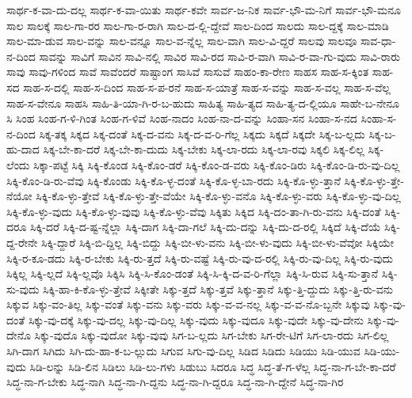 {ಸಾರ್ಥ-ಕ-ವಾ-ದು-ದಲ್ಲ
ಸಾರ್ಥ-ಕ-ವಾ-ಯಿತು
ಸಾರ್ಥ-ಕವೇ
ಸಾರ್ವ-ಜ-ನಿಕ
ಸಾರ್ವ-ಭೌ-ಮ-ನಿಗೆ
ಸಾರ್ವ-ಭೌ-ಮನೂ
ಸಾಲ
ಸಾಲಕ್ಕೆ
ಸಾಲ-ಗಾ-ರರ
ಸಾಲ-ಗಾ-ರ-ರಾಗಿ
ಸಾಲ-ದ-ಲ್ಲಿ-ದ್ದೇವೆ
ಸಾಲ-ದಿಂದ
ಸಾಲದು
ಸಾಲ-ದ್ದಕ್ಕೆ
ಸಾಲ-ಮಾಡಿ
ಸಾಲ-ಮಾ-ಡುವ
ಸಾಲ-ವನ್ನು
ಸಾಲ-ವನ್ನೂ
ಸಾಲ-ವ-ನ್ನೆಲ್ಲ
ಸಾಲ-ವಾಗಿ
ಸಾಲ-ವಿ-ದ್ದರೆ
ಸಾಲವು
ಸಾಲವೂ
ಸಾವ-ಧಾ-ನ-ದಿಂದ
ಸಾವನ್ನು
ಸಾವಿಗೆ
ಸಾವಿನ
ಸಾವಿ-ನಲ್ಲಿ
ಸಾವಿರ
ಸಾವಿ-ರದ
ಸಾವಿ-ರ-ವಾಗಿ
ಸಾವಿ-ರ-ವಾ-ಗು-ವುದು
ಸಾವಿ-ರಾರು
ಸಾವು
ಸಾವು-ಗಳಿಂದ
ಸಾವೆ
ಸಾವೆಂದರೆ
ಸಾಷ್ಟಾಂಗ
ಸಾಸಿವೆ
ಸಾಸುವೆ
ಸಾಹಂ-ಕಾ-ರೇಣ
ಸಾಹಸ
ಸಾಹ-ಸ-ಕ್ಕಿಂತ
ಸಾಹ-ಸದ
ಸಾಹ-ಸ-ದಲ್ಲಿ
ಸಾಹ-ಸ-ದಿಂದ
ಸಾಹ-ಸ-ಪ-ರನೆ
ಸಾಹ-ಸ-ಯಾತ್ರೆ
ಸಾಹ-ಸ-ವನ್ನು
ಸಾಹ-ಸ-ವಲ್ಲ
ಸಾಹ-ಸ-ವೆಲ್ಲ
ಸಾಹ-ಸ-ವೇನೂ
ಸಾಹಸಿ
ಸಾಹಿ-ತಿ-ಯಾ-ಗಿ-ರ-ಬ-ಹುದು
ಸಾಹಿತ್ಯ
ಸಾಹಿ-ತ್ಯದ
ಸಾಹಿ-ತ್ಯ-ದ-ಲ್ಲಿಯೂ
ಸಾಹೇ-ಬ-ನೇನೂ
ಸಿ
ಸಿಂಹ
ಸಿಂಹ-ಗ-ಳಿ-ಗಿಂತ
ಸಿಂಹ-ಗ-ಳಿವೆ
ಸಿಂಹ-ನಾದಂ
ಸಿಂಹ-ನಾ-ದ-ವನ್ನು
ಸಿಂಹಾ-ಸನ
ಸಿಂಹಾ-ಸ-ನದ
ಸಿಂಹಾ-ಸ-ನ-ದಿಂದ
ಸಿಕ್ಕ-ತಕ್ಕ
ಸಿಕ್ಕದ
ಸಿಕ್ಕ-ದಂತೆ
ಸಿಕ್ಕ-ದ-ವನು
ಸಿಕ್ಕ-ದ-ವ-ರಿ-ಗೆಲ್ಲ
ಸಿಕ್ಕದು
ಸಿಕ್ಕದೆ
ಸಿಕ್ಕದೇ
ಸಿಕ್ಕ-ಬ-ಲ್ಲದು
ಸಿಕ್ಕ-ಬ-ಹು-ದಾದ
ಸಿಕ್ಕ-ಬೇ-ಕಾ-ದರೆ
ಸಿಕ್ಕ-ಬೇ-ಕಾ-ದುದು
ಸಿಕ್ಕ-ಬೇಕು
ಸಿಕ್ಕ-ಲಾ-ರದು
ಸಿಕ್ಕ-ಲಾ-ರವು
ಸಿಕ್ಕಲಿ
ಸಿಕ್ಕ-ಲಿಲ್ಲ
ಸಿಕ್ಕ-ಲೆಂದು
ಸಿಕ್ಕಾ-ಪಟ್ಟೆ
ಸಿಕ್ಕಿ
ಸಿಕ್ಕಿ-ಕೊಂಡ
ಸಿಕ್ಕಿ-ಕೊಂ-ಡರೆ
ಸಿಕ್ಕಿ-ಕೊಂ-ಡ-ವರು
ಸಿಕ್ಕಿ-ಕೊಂ-ಡಿರು
ಸಿಕ್ಕಿ-ಕೊಂ-ಡಿ-ರು-ವು-ದಿಲ್ಲ
ಸಿಕ್ಕಿ-ಕೊಂ-ಡಿ-ರು-ವೆವು
ಸಿಕ್ಕಿ-ಕೊಂಡು
ಸಿಕ್ಕಿ-ಕೊ-ಳ್ಳ-ದಂತೆ
ಸಿಕ್ಕಿ-ಕೊ-ಳ್ಳ-ಬಾ-ರದು
ಸಿಕ್ಕಿ-ಕೊ-ಳ್ಳು-ತ್ತಾನೆ
ಸಿಕ್ಕಿ-ಕೊ-ಳ್ಳು-ತ್ತೇ-ನೆಯೋ
ಸಿಕ್ಕಿ-ಕೊ-ಳ್ಳು-ತ್ತೇವೆ
ಸಿಕ್ಕಿ-ಕೊ-ಳ್ಳು-ತ್ತೇ-ವೆಯೇ
ಸಿಕ್ಕಿ-ಕೊ-ಳ್ಳು-ವನೊ
ಸಿಕ್ಕಿ-ಕೊ-ಳ್ಳು-ವರು
ಸಿಕ್ಕಿ-ಕೊ-ಳ್ಳು-ವು-ದಿಲ್ಲ
ಸಿಕ್ಕಿ-ಕೊ-ಳ್ಳು-ವುದು
ಸಿಕ್ಕಿ-ಕೊ-ಳ್ಳು-ವುವು
ಸಿಕ್ಕಿ-ಕೊ-ಳ್ಳು-ವೆವು
ಸಿಕ್ಕಿತು
ಸಿಕ್ಕಿದ
ಸಿಕ್ಕಿ-ದಂ-ತಾ-ಗಿ-ರು-ವನು
ಸಿಕ್ಕಿ-ದಂತೆ
ಸಿಕ್ಕಿ-ದರೂ
ಸಿಕ್ಕಿ-ದರೆ
ಸಿಕ್ಕಿ-ದ-ಷ್ಟ-ನ್ನೆಲ್ಲಾ
ಸಿಕ್ಕಿ-ದಾಗ
ಸಿಕ್ಕಿ-ದಾ-ಗಲೆ
ಸಿಕ್ಕಿ-ದು-ದನ್ನು
ಸಿಕ್ಕಿ-ದು-ದ-ರಲ್ಲಿ
ಸಿಕ್ಕಿದೆ
ಸಿಕ್ಕಿ-ದೆಯೆ
ಸಿಕ್ಕಿ-ದ್ದ-ರೇನೇ
ಸಿಕ್ಕಿ-ದ್ದಾರೆ
ಸಿಕ್ಕಿ-ಬಿ-ದ್ದಿಲ್ಲ
ಸಿಕ್ಕಿ-ಬಿದ್ದು
ಸಿಕ್ಕಿ-ಬೀ-ಳು-ವನು
ಸಿಕ್ಕಿ-ಬೀ-ಳು-ವುದು
ಸಿಕ್ಕಿ-ಬೀ-ಳು-ವೆವೋ
ಸಿಕ್ಕಿಯೇ
ಸಿಕ್ಕಿ-ರ-ಕೂ-ಡದು
ಸಿಕ್ಕಿ-ರ-ಬೇಕು
ಸಿಕ್ಕಿ-ರು-ತ್ತದೆ
ಸಿಕ್ಕಿ-ರು-ವಷ್ಟೆ
ಸಿಕ್ಕಿ-ರು-ವು-ದ-ರಲ್ಲಿ
ಸಿಕ್ಕಿ-ರು-ವು-ದಿಲ್ಲ
ಸಿಕ್ಕಿ-ರು-ವುದು
ಸಿಕ್ಕಿಲ್ಲ
ಸಿಕ್ಕಿ-ಲ್ಲದೆ
ಸಿಕ್ಕಿ-ಲ್ಲವೊ
ಸಿಕ್ಕಿಸಿ
ಸಿಕ್ಕಿ-ಸಿ-ಕೊಂ-ಡಂತೆ
ಸಿಕ್ಕಿ-ಸಿ-ಕ್ಕಿ-ದ-ವ-ರಿ-ಗೆಲ್ಲಾ
ಸಿಕ್ಕಿ-ಸಿ-ರುವ
ಸಿಕ್ಕಿ-ಸು-ತ್ತಾನೆ
ಸಿಕ್ಕಿ-ಸು-ವುದು
ಸಿಕ್ಕಿ-ಹಾ-ಕಿ-ಕೊ-ಳ್ಳು-ತ್ತೇವೆ
ಸಿಕ್ಕೀತೇ
ಸಿಕ್ಕು-ತ್ತದೆ
ಸಿಕ್ಕು-ತ್ತವೆ
ಸಿಕ್ಕು-ತ್ತಾನೆ
ಸಿಕ್ಕು-ತ್ತಿ-ದ್ದುದು
ಸಿಕ್ಕು-ತ್ತಿ-ರು-ವನು
ಸಿಕ್ಕುವ
ಸಿಕ್ಕು-ವಂ-ತಿಲ್ಲ
ಸಿಕ್ಕು-ವಂತೆ
ಸಿಕ್ಕು-ವನು
ಸಿಕ್ಕು-ವರು
ಸಿಕ್ಕು-ವ-ವ-ನಲ್ಲ
ಸಿಕ್ಕು-ವ-ವ-ನೊ-ಬ್ಬನೇ
ಸಿಕ್ಕುವು
ಸಿಕ್ಕು-ವು-ದಂತೆ
ಸಿಕ್ಕು-ವು-ದಕ್ಕೆ
ಸಿಕ್ಕು-ವು-ದಲ್ಲ
ಸಿಕ್ಕು-ವು-ದಿಲ್ಲ
ಸಿಕ್ಕು-ವುದು
ಸಿಕ್ಕು-ವುದೂ
ಸಿಕ್ಕು-ವುದೇ
ಸಿಕ್ಕು-ವು-ದೇನು
ಸಿಕ್ಕು-ವು-ದೇನೊ
ಸಿಕ್ಕು-ವುದೊ
ಸಿಕ್ಕು-ವುದೋ
ಸಿಕ್ಕು-ವುವು
ಸಿಗ-ಬ-ಲ್ಲದು
ಸಿಗ-ಬೇಕು
ಸಿಗ-ರೇ-ಟಿಗೆ
ಸಿಗ-ಲಾ-ರದು
ಸಿಗ-ಲಿಲ್ಲ
ಸಿಗಿ-ದಾಗ
ಸಿಗಿದು
ಸಿಗಿ-ದು-ಹಾ-ಕ-ಬ-ಲ್ಲುದು
ಸಿಗುವ
ಸಿಗು-ವು-ದಿಲ್ಲ
ಸಿಡಿದ
ಸಿಡಿದು
ಸಿಡಿಯು
ಸಿಡಿ-ಯುವ
ಸಿಡಿ-ಯು-ವುದು
ಸಿಡಿ-ಲನ್ನು
ಸಿಡಿ-ಲಿನ
ಸಿಡಿಲು
ಸಿಡಿ-ಲು-ಗಳು
ಸಿಡುಬು
ಸಿದರೂ
ಸಿದ್ಧ
ಸಿದ್ಧ-ತೆ-ಗ-ಳೆಲ್ಲ
ಸಿದ್ಧ-ನಾ-ಗ-ಬೇ-ಕಾ-ದರೆ
ಸಿದ್ಧ-ನಾ-ಗ-ಬೇಕು
ಸಿದ್ಧ-ನಾಗಿ
ಸಿದ್ಧ-ನಾ-ಗಿ-ದ್ದನು
ಸಿದ್ಧ-ನಾ-ಗಿ-ದ್ದರೂ
ಸಿದ್ಧ-ನಾ-ಗಿ-ದ್ದೇನೆ
ಸಿದ್ಧ-ನಾ-ಗಿರ
}

